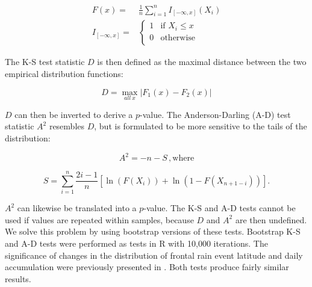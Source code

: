\documentclass[singlecolumn,11pt]{pnas-new}
\begin{document}
\begin{align}
	F(x) =& \frac{1}{n}\sum_{i=1}^n I_{[-\infty,x]} (X_i) \\
	I_{[-\infty,x]} =& 
	\begin{cases}
   		 1 & \text{if } X_i \leq x\\
    		0 & \text{otherwise} \\
    	\end{cases}
\end{align}

 The K-S test statistic $D$ is then defined as the maximal distance between the two empirical distribution functions:

\begin{equation}
	D=\max_{all\ x} |F_{1}(x)-F_{2}(x)|
\end{equation}

$D$ can then be inverted to derive a $p$-value. The Anderson-Darling (A-D) test statistic $A^2$ resembles $D$, but is formulated to be more sensitive to the tails of the distribution:

\begin{equation}
	A^2 = -n-S \,,
	\mathrm{where}
\end{equation}

\begin{equation}
	S=\sum_{i=1}^n \frac{2i-1}{n}\left[\ln(F(X_i)) + \ln\left(1-F(X_{n+1-i})\right)\right].
\end{equation}

	$A^2$ can likewise be translated into a $p$-value. The K-S and A-D tests cannot be used if values are repeated within samples, because $D$ and $A^2$ are then undefined. We solve this problem by using bootstrap versions of these tests. Bootstrap K-S and A-D tests were performed as tests in R with 10,000 iterations. The significance of changes in the distribution of frontal rain event latitude and daily accumulation were previously presented in \cite{Day2016}. Both tests produce fairly similar results.
	
\clearpage

\end{document}
